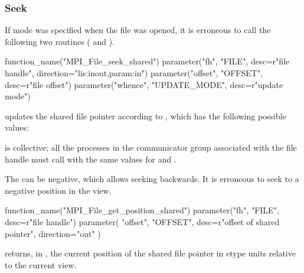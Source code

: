 \subsubsection{Seek}
\label{sec:io-shared-ptr-seek}

If  mode was specified when the file was opened,
it is erroneous to call the following two routines
( and ).

%
%
\begin{mpi-binding}
    function_name("MPI_File_seek_shared")
    parameter("fh", "FILE", desc=r"file handle", direction="lis:inout,param:in")
    parameter("offset", "OFFSET", desc=r"file offset")
    parameter("whence", "UPDATE_MODE", desc=r"update mode")
\end{mpi-binding}

 updates the shared file pointer according to 
,
which has
the following possible values:
\begin{constlist}
\end{constlist}

 is collective;
all the processes in the communicator group associated with the file
handle  must call  with the same
values for
 and .
 
The  can be negative, which allows seeking backwards.
It is erroneous to seek to a negative position in the view.

%
%
\begin{mpi-binding}
    function_name("MPI_File_get_position_shared")
    parameter("fh", "FILE", desc=r"file handle")
    parameter(
        "offset", "OFFSET", desc=r"offset of shared pointer", direction="out"
    )
\end{mpi-binding}

 returns, in ,
the current position of the shared file pointer in etype units
relative to the current
view.

